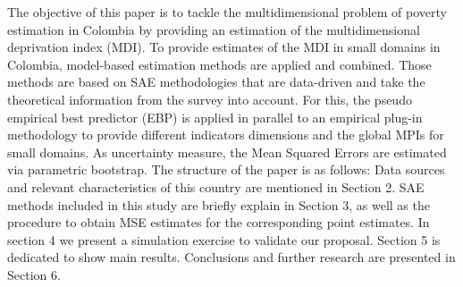 \documentclass[a4paper, 11pt]{article}
\begin{document}
The objective of this paper is to tackle the multidimensional problem of poverty estimation in Colombia by providing an estimation of the multidimensional deprivation index (MDI). To provide estimates of the MDI in small domains in Colombia, model-based estimation methods are applied and combined. Those methods are based on SAE methodologies that are data-driven and take the theoretical information from the survey into account. For this, the pseudo empirical best predictor (EBP) is applied in parallel to an empirical plug-in methodology to provide different indicators dimensions and the global MPIs for small domains. As uncertainty measure, the Mean Squared Errors are estimated via parametric bootstrap.
The structure of the paper is as follows: Data sources and relevant characteristics of this country are mentioned in Section 2. SAE methods included in this study are briefly explain in Section 3, as well as the procedure to obtain MSE estimates for the corresponding point estimates. In section 4 we present a simulation exercise to validate our proposal. Section 5 is dedicated to show main results. Conclusions and further research are presented in Section 6. 











    




\end{document}
